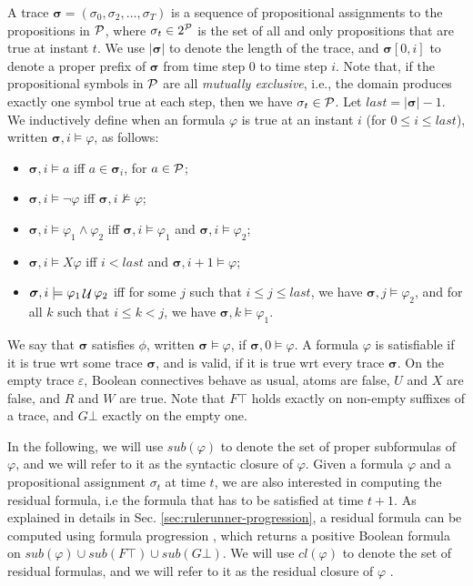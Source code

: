 A trace $\boldsymbol{\sigma} = (\sigma_{0}, \sigma_{2}, \dots, \sigma_{T})$ is a sequence of propositional assignments to the propositions in ${\mathcal{P}}$, where $\sigma_{t} \in 2^{\mathcal{P}}$ is the set of all and only propositions that are true at instant $t$. We use $|\boldsymbol{\sigma}|$ to denote the length of the trace, and $\boldsymbol{\sigma}[0,i]$ to denote a proper prefix of $\boldsymbol{\sigma}$ from time step $0$ to time step $i$.
Note that, if the propositional symbols in ${\mathcal{P}}$ are all \textit{mutually exclusive}, i.e., the domain produces exactly one symbol true at each step, then we have $\sigma_{t} \in {\ensuremath{\mathcal{P}}}$.
%
Let $last = |\boldsymbol{\sigma}| - 1$. We inductively define when
an \ltlf formula $\varphi$ is true at an instant $i$ (for $0 \leq i \leq last$), written $\boldsymbol{\sigma},i \models \varphi$, as follows:
\begin{itemize}
    \item $\boldsymbol{\sigma}, i \models a$ iff $a \in \boldsymbol{\sigma}_i$, for $a \in {\ensuremath{\mathcal{P}}}$;
    \item $\boldsymbol{\sigma}, i \models \neg \varphi$ iff $\boldsymbol{\sigma}, i \not\models \varphi$;
    \item $\boldsymbol{\sigma}, i \models \varphi_1 \land \varphi_2$ iff $\boldsymbol{\sigma}, i \models \varphi_1$ and $\boldsymbol{\sigma}, i \models \varphi_2$;
    \item $\boldsymbol{\sigma}, i \models X\varphi$ iff $i < last$ and  $\boldsymbol{\sigma}, i + 1 \models \varphi$;
    \item $\boldsymbol{\sigma}, i \models \varphi_1 \mathop{{\mathcal{U}}} \varphi_2$ iff for some $j$ such that $i \leq j \leq last$, we have $\boldsymbol{\sigma}, j \models \varphi_2$, and for all $k$ such that $i \leq k < j$, we have $\boldsymbol{\sigma}, k \models \varphi_1$.
\end{itemize}
%
\noindent
We say that $\boldsymbol{\sigma}$ satisfies $\phi$, written $\boldsymbol{\sigma} \models \varphi$, if $\boldsymbol{\sigma}, 0 \models \varphi$. A formula $\varphi$ is satisfiable if it is true wrt some trace $\boldsymbol{\sigma}$, and is valid, if it is true wrt every trace $\boldsymbol{\sigma}$.
%
On the empty trace $\varepsilon$, Boolean connectives behave as usual, atoms are false, $U$ and $X$ are false, and $R$ and $W$ are true. Note that $F\top$ holds exactly on non-empty suffixes of a trace, and $G\bot$ exactly on the empty one.


In the following, we will use $sub(\varphi)$ to denote the set of proper subformulas of $\varphi$, and we will refer to it as the syntactic closure of $\varphi$. Given a formula $\varphi$ and a propositional assignment $\sigma_t$ at time $t$, we are also interested in computing the residual formula, i.e the formula that has to be satisfied at time $t+1$. As explained in details in Sec. \ref{sec:rulerunner-progression}, a residual formula can be computed using formula progression \cite{}, which returns a positive Boolean formula on $sub(\varphi) \cup sub(F \top) \cup sub(G \bot)$. We will use $cl(\varphi)$ to denote the set of residual formulas, and we will refer to it as the residual closure of $\varphi$ .


